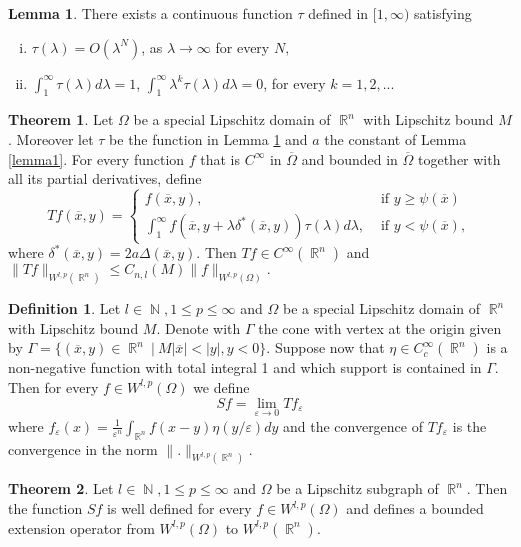 \documentclass[12pt]{article}
\theoremstyle{definition}
\newtheorem{definition}{Definition}
\newtheorem{theorem}{Theorem}
\newtheorem{lemma}{Lemma}
\DeclareMathOperator\rr{\mathbb{R}}
\DeclareMathOperator\nn{\mathbb{N}}
\begin{document}
\begin{lemma}\label{lemma2}
There exists a continuous function $\tau$ defined in $[1,\infty)$ satisfying
\begin{enumerate}[i)]
	\item $\tau(\lambda)=O(\lambda^N)$, as $\lambda \rightarrow \infty$ for every $N,$
	\item $\int_1^\infty \tau(\lambda)d\lambda=1$, $\int_1^\infty \lambda^k\tau(\lambda)d\lambda=0$, for every $k=1,2,...$
\end{enumerate}
\end{lemma}


\begin{theorem}\label{defT}Let $\Omega$ be a special Lipschitz domain of $\rr^n$ with Lipschitz bound $M$. Moreover let $\tau$ be the function in Lemma \ref{lemma2} and $a$ the constant of Lemma \ref{lemma1}. For every function $f$ that is $C^\infty$ in $\overline \Omega$ and bounded in $\overline \Omega$ together with all its partial derivatives, define
\[ Tf(\overline x, y)= \begin{cases}
						f(\overline x, y), & \text{ if } y\ge\psi(\overline x) \\
						\int_1^\infty f(\overline x, y+ \lambda \delta^*(\overline x,y))\tau(\lambda)d\lambda, & \text{ if } y<\psi(\overline x),		
\end{cases}
\]
where $\delta^*(\overline x,y)=2a\Delta(\overline x, y).$ Then $Tf \in C^\infty(\rr^n)$ and $\| Tf\|_{W^{l,p}(\rr^n)}\le C_{n,l}(M) \| f\|_{W^{l,p}(\Omega)} .$
\end{theorem}

\begin{definition}Let $l \in \nn,1\le p \le \infty$ and $\Omega$ be a special Lipschitz domain of $\rr^n$ with Lipschitz bound $M$. Denote with $\Gamma$ the cone with vertex at the origin given by $\Gamma=\{(\overline x, y) \in \rr^n \ | \ M |\overline x|<|y|, y<0 \}$. Suppose now that $\eta \in C^\infty_c(\rr^n)$ is a non-negative function with total integral 1 and which support is contained in $\Gamma.$ Then for every $f \in W^{l,p}(\Omega)$ we define
\[ Sf = \lim_{\varepsilon \to 0} Tf_\varepsilon \]
where $f_\varepsilon(x)=\frac{1}{\varepsilon^n}\int_{\rr^n} f(x-y) \eta(y/\varepsilon)dy$ and the convergence of $Tf_\varepsilon$ is the convergence in the norm  $\|. \|_{W^{l,p}(\rr^n)}$.
\end{definition}


\begin{theorem}
Let $l \in \nn,1\le p \le \infty$ and $\Omega$ be a Lipschitz subgraph of $\rr^n$. Then the function $Sf$ is well defined for every $f \in W^{l,p}(\Omega)$ and defines a bounded extension operator from $W^{l,p}(\Omega)$ to $W^{l,p}(\rr^n).$
\end{theorem}
\end{document}
